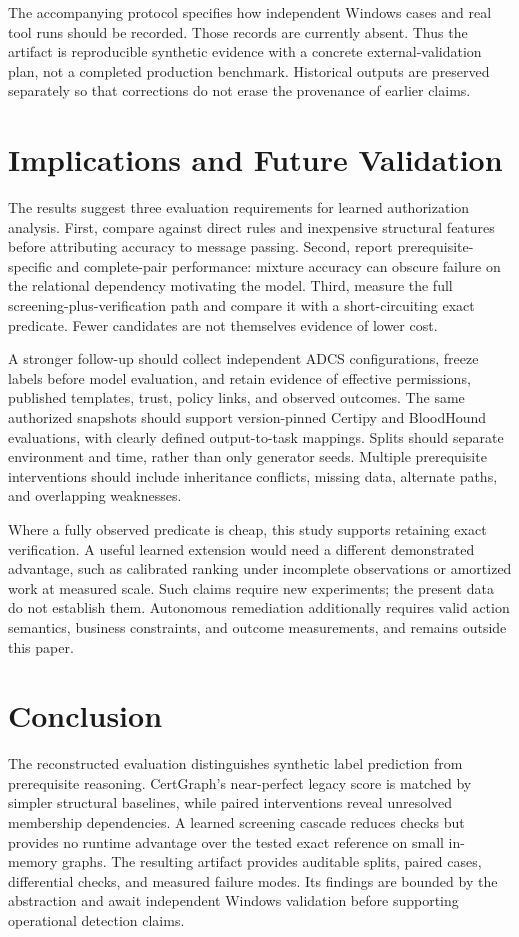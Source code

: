\documentclass[journal]{IEEEtran}
\begin{document}
The accompanying protocol specifies how independent Windows cases and real tool runs should be recorded. Those records are currently absent. Thus the artifact is reproducible synthetic evidence with a concrete external-validation plan, not a completed production benchmark. Historical outputs are preserved separately so that corrections do not erase the provenance of earlier claims.

\section{Implications and Future Validation}
The results suggest three evaluation requirements for learned authorization analysis. First, compare against direct rules and inexpensive structural features before attributing accuracy to message passing. Second, report prerequisite-specific and complete-pair performance: mixture accuracy can obscure failure on the relational dependency motivating the model. Third, measure the full screening-plus-verification path and compare it with a short-circuiting exact predicate. Fewer candidates are not themselves evidence of lower cost.

A stronger follow-up should collect independent ADCS configurations, freeze labels before model evaluation, and retain evidence of effective permissions, published templates, trust, policy links, and observed outcomes. The same authorized snapshots should support version-pinned Certipy and BloodHound evaluations, with clearly defined output-to-task mappings. Splits should separate environment and time, rather than only generator seeds. Multiple prerequisite interventions should include inheritance conflicts, missing data, alternate paths, and overlapping weaknesses.

Where a fully observed predicate is cheap, this study supports retaining exact verification. A useful learned extension would need a different demonstrated advantage, such as calibrated ranking under incomplete observations or amortized work at measured scale. Such claims require new experiments; the present data do not establish them. Autonomous remediation additionally requires valid action semantics, business constraints, and outcome measurements, and remains outside this paper.

\section{Conclusion}
The reconstructed evaluation distinguishes synthetic label prediction from prerequisite reasoning. CertGraph's near-perfect legacy score is matched by simpler structural baselines, while paired interventions reveal unresolved membership dependencies. A learned screening cascade reduces checks but provides no runtime advantage over the tested exact reference on small in-memory graphs. The resulting artifact provides auditable splits, paired cases, differential checks, and measured failure modes. Its findings are bounded by the abstraction and await independent Windows validation before supporting operational detection claims.


\end{document}
